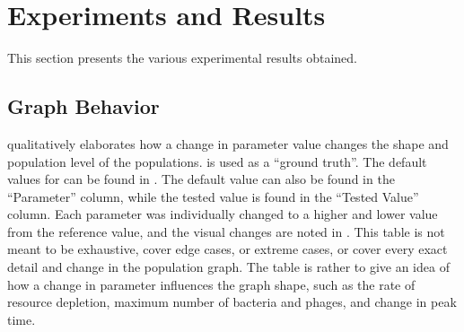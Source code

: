 \chapter{Experiments and Results}
\label{AER}
This section presents the various experimental results obtained. 

\section{Graph Behavior}
 qualitatively elaborates how a change in parameter value changes the shape and population level of the populations. 
 is used as a “ground truth”.  
The default values for  can be found in . 
The default value can also be found in the “Parameter” column, while the tested value is found in the “Tested Value” column. 
Each parameter was individually changed to a higher and lower value from the reference value, and the visual changes are noted in . 
This table is not meant to be exhaustive, cover edge cases, or extreme cases, or cover every exact detail and change in the population graph. 
The table is rather to give an idea of how a change in parameter influences the graph shape, such as the rate of resource depletion, maximum number of bacteria and phages, and change in peak time. 

